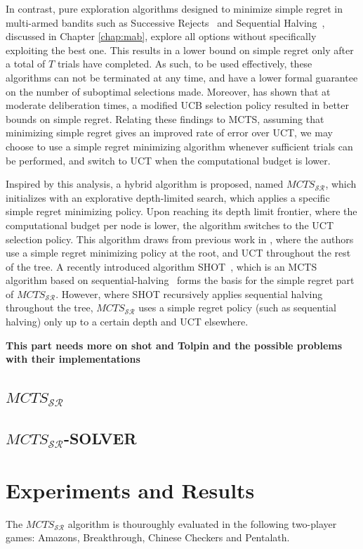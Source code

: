 \documentclass{kecsmstr}
\newcommand{\mctssr}{MCTS_{\mathcal{S}\mathcal{R}}}
\newcommand{\redbold}[1]{\textbf{\color{red}#1}}
\begin{document}
In contrast, pure exploration algorithms designed to minimize simple regret in multi-armed bandits such as Successive Rejects~ and Sequential Halving~, discussed in Chapter \ref{chap:mab}, explore all options without specifically exploiting the best one. This results in a lower bound on simple regret only after a total of $T$ trials have completed. As such, to be used effectively, these algorithms can not be terminated at any time, and have a lower formal guarantee on the number of suboptimal selections made. Moreover,  has shown that at moderate deliberation times, a modified UCB selection policy resulted in better bounds on simple regret. Relating these findings to MCTS, assuming that minimizing simple regret gives an improved rate of error over UCT, we may choose to use a simple regret minimizing algorithm whenever sufficient trials can be performed, and switch to UCT when the computational budget is lower.

Inspired by this analysis, a hybrid algorithm is proposed, named $\mctssr$, which initializes with an explorative depth-limited search, which applies a specific simple regret minimizing policy. Upon reaching its depth limit frontier, where the computational budget per node is lower, the algorithm switches to the UCT selection policy. This algorithm draws from previous work in , where the authors use a simple regret minimizing policy at the root, and UCT throughout the rest of the tree. A recently introduced algorithm SHOT~, which is an MCTS algorithm based on sequential-halving~ forms the basis for the simple regret part of $\mctssr$. However, where SHOT recursively applies sequential halving throughout the tree, $\mctssr$ uses a simple regret policy (such as sequential halving) only up to a certain depth and UCT elsewhere. 

\redbold{This part needs more on shot and Tolpin and the possible problems with their implementations}

\section{$\mctssr$}

\section{$\mctssr$-SOLVER}

\chapter{Experiments and Results}
\label{chap:experiments}
\begin{chaptercontents}
The $\mctssr$ algorithm is thouroughly evaluated in the following two-player games: Amazons, Breakthrough, Chinese Checkers and Pentalath.
\end{chaptercontents}
\end{document}

